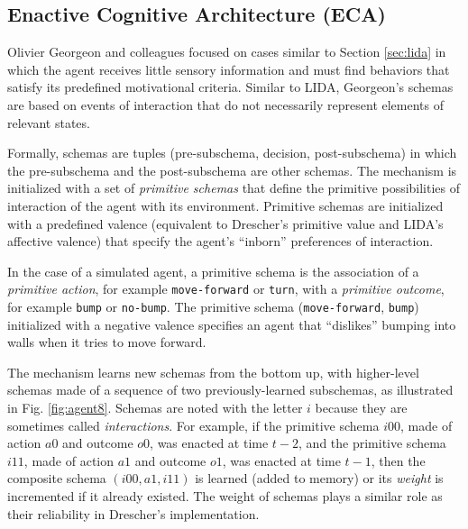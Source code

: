 \documentclass[runningheads]{llncs}
\begin{document}
\subsection{Enactive Cognitive Architecture (ECA)}

Olivier Georgeon and colleagues focused on cases similar to Section \ref{sec:lida} in which the agent receives little sensory information and must find behaviors that satisfy its predefined motivational criteria. 
Similar to LIDA, Georgeon's schemas are based on events of interaction that do not necessarily represent elements of relevant states.  

Formally, schemas are tuples (pre-subschema, decision, post-subschema) in which the pre-subschema and the post-subschema are other schemas.  
The mechanism is initialized with a set of \textit{primitive schemas} that define the primitive possibilities of interaction of the agent with its environment. 
Primitive schemas are initialized with a predefined valence (equivalent to Drescher's primitive value and LIDA's affective valence) that specify the agent's ``inborn'' preferences of interaction. 

In the case of a simulated agent, a primitive schema is the association of a \textit{primitive action}, for example \texttt{move-forward} or \texttt{turn}, with a \textit{primitive outcome}, for example \texttt{bump} or \texttt{no-bump}.  
The primitive schema (\texttt{move-forward}, \texttt{bump}) initialized with a negative valence specifies an agent that ``dislikes'' bumping into walls when it tries to move forward. 

The mechanism learns new schemas from the bottom up, with higher-level schemas made of a sequence of two previously-learned subschemas, 
as illustrated in Fig. \ref{fig:agent8}. 
Schemas are noted with the letter $i$ because they are sometimes called \textit{interactions}.
For example, if the primitive schema $i00$, made of action $a0$ and outcome $o0$, was enacted at time $t-2$, and the primitive schema $i11$, made of action $a1$ and outcome $o1$,  was enacted at time $t-1$, then the composite schema $(i00, a1, i11)$ is learned (added to memory) or its \textit{weight} is incremented if it already existed. 
The weight of schemas plays a similar role as their reliability in Drescher's implementation.
\end{document}
